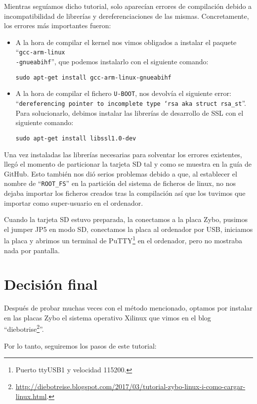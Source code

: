 \documentclass[12pt,letterpaper]{article}
\begin{document}
Mientras seguíamos dicho tutorial, solo aparecían errores de compilación debido a incompatibilidad de librerías y dereferenciaciones de las mismas. Concretamente, los errores más importantes fueron:
\begin{itemize}
	\item A la hora de compilar el kernel nos vimos obligados a instalar el paquete ``\texttt{gcc-arm-linux\\-gnueabihf}'', que podemos instalarlo con el siguiente comando:
	\begin{center}
		\texttt{sudo apt-get install gcc-arm-linux-gnueabihf}
	\end{center}
	\item A la hora de compilar el fichero \texttt{U-BOOT}, nos devolvía el siguiente error: ``\texttt{dereferencing pointer to incomplete type ‘rsa aka struct rsa\_st}''. Para solucionarlo, debimos instalar las librerías de desarrollo de SSL con el siguiente comando:
	\begin{center}
		\texttt{sudo apt-get install libssl1.0-dev}
	\end{center}
\end{itemize}
Una vez instaladas las librerías necesarias para solventar los errores existentes, llegó el momento de particionar la tarjeta SD tal y como se muestra en la guía de GitHub. Esto también nos dió serios problemas debido a que, al establecer el nombre de ``\texttt{ROOT\_FS}'' en la partición del sistema de ficheros de linux, no nos dejaba importar los ficheros creados tras la compilación así que los tuvimos que importar como super-usuario en el ordenador.

Cuando la tarjeta SD estuvo preparada, la conectamos a la placa Zybo, pusimos el jumper JP5 en modo SD, conectamos la placa al ordenador por USB, iniciamos la placa y abrimos un terminal de PuTTY\footnote{Puerto ttyUSB1 y velocidad 115200.} en el ordenador, pero no mostraba nada por pantalla.

\section{Decisión final}
Después de probar muchas veces con el método mencionado, optamos por instalar en las placas Zybo el sistema operativo Xilinux que vimos en el blog ``diebotrise\footnote{\url{http://diebotreise.blogspot.com/2017/03/tutorial-zybo-linux-i-como-cargar-linux.html}.}''.

Por lo tanto, seguiremos los pasos de este tutorial:
\end{document}
